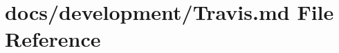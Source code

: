 \hypertarget{Travis_8md}{\section{docs/development/\+Travis.md File Reference}
\label{Travis_8md}
}
